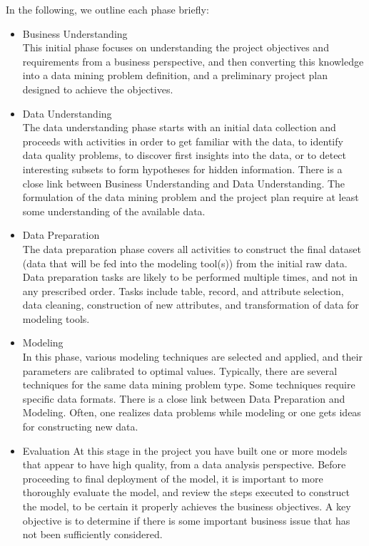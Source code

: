 In the following, we outline each phase briefly:
\begin{itemize}
\item Business Understanding\\
This initial phase focuses on understanding the project objectives and requirements from a
business perspective, and then converting this knowledge into a data mining problem
definition, and a preliminary project plan designed to achieve the objectives.
\item  Data Understanding\\
The data understanding phase starts with an initial data collection and proceeds with activities
in order to get familiar with the data, to identify data quality problems, to discover first
insights into the data, or to detect interesting subsets to form hypotheses for hidden
information.
There is a close link between Business Understanding and Data Understanding. The
formulation of the data mining problem and the project plan require at least some
understanding of the available data.
\item  Data Preparation\\
The data preparation phase covers all activities to construct the final dataset (data that will be
fed into the modeling tool(s)) from the initial raw data. Data preparation tasks are likely to be
performed multiple times, and not in any prescribed order. Tasks include table, record, and attribute selection, data cleaning, construction of new attributes, and transformation of data for
modeling tools.
\item Modeling\\
In this phase, various modeling techniques are selected and applied, and their parameters are
calibrated to optimal values. Typically, there are several techniques for the same data mining
problem type. Some techniques require specific data formats.
There is a close link between Data Preparation and Modeling. Often, one realizes data
problems while modeling or one gets ideas for constructing new data.
\item Evaluation
At this stage in the project you have built one or more models that appear to have high quality,
from a data analysis perspective. Before proceeding to final deployment of the model, it is
important to more thoroughly evaluate the model, and review the steps executed to construct
the model, to be certain it properly achieves the business objectives. A key objective is to
determine if there is some important business issue that has not been sufficiently considered.

\end{itemize}
